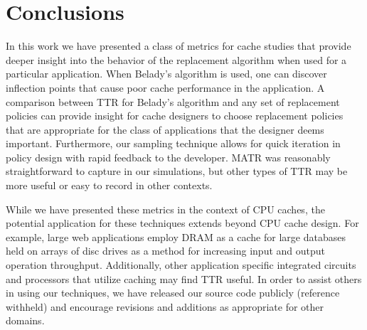 \section{Conclusions}
In this work we have presented a class of metrics for cache studies
that provide deeper insight into the behavior of the replacement
algorithm when used for a particular application.
When Belady's algorithm is used, one can discover inflection points
that cause poor cache performance in the application.
A comparison between TTR for Belady's algorithm and any set of
replacement policies can provide insight for cache designers to choose
replacement policies that are appropriate for the class of
applications that the designer deems important.
Furthermore, our sampling technique allows for quick iteration in
policy design with rapid feedback to the developer.
MATR was reasonably straightforward to capture in our simulations, but
other types of TTR may be more useful or easy to record in other
contexts.

While we have presented these metrics in the context of CPU caches,
the potential application for these techniques extends beyond CPU
cache design.
For example, large web applications employ DRAM as a cache for large
databases held on arrays of disc drives as a method for increasing
input and output operation throughput.
Additionally, other application specific integrated circuits and
processors that utilize caching may find TTR useful.
In order to assist others in using our techniques, we have released
our source code publicly (reference withheld) and encourage revisions
and additions as appropriate for other domains.
